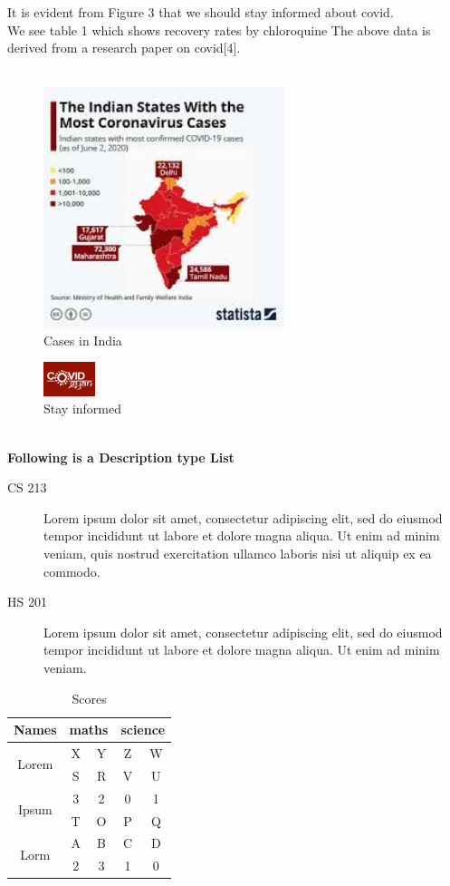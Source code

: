 \documentclass{article}
\begin{document}
It is evident from Figure 3 that we should stay informed about covid.\\
We see table 1 which shows recovery rates by chloroquine
The above data is derived from a research paper on covid[4].
\\
\\
\begin{figure}[h]
    \centering
    \includegraphics[width=7cm]{c19.jpg}
    \caption{Cases in India}
    \label{fig:enter-label}
\end{figure}
\begin{figure}[h]
    \centering
    \includegraphics[width = 1.5cm]{cov.png}
    \caption{Stay informed}
    \label{fig:enter-label}
\end{figure}
\\
\textbf{Following is a Description type List}
\begin{description}
  \item[CS 213] Lorem ipsum dolor sit amet, consectetur adipiscing elit, sed do eiusmod tempor incididunt ut labore et dolore magna aliqua. Ut enim ad minim veniam, quis nostrud exercitation ullamco laboris nisi ut aliquip ex ea commodo.

  \item[HS 201] Lorem ipsum dolor sit amet, consectetur adipiscing elit, sed do eiusmod tempor incididunt ut labore et dolore magna aliqua. Ut enim ad minim veniam.
\end{description}

\newpage
\pagecolor{green}
\begin{table}[ht]
\centering
\begin{tabular}{|c|c|c|c|c|}
    \hline
    Names & \multicolumn{2}{c|}{maths} & \multicolumn{2}{c|}{science} \\ 
    \hline
    \multirow{2}{*}{Lorem} & X & Y & Z & W \\ \cline{2-5}
    & S & R & V & U	 \\ 
    \hline
    \multirow{2}{*}{Ipsum} & 3 & 2 & 0 & 1 \\ \cline{2-5}
    & T & O & P & Q \\
    \hline
    \multirow{2}{*}{Lorm} & A & B & C & D \\ \cline{2-5}
    & 2 & 3 & 1 & 0 \\
    \hline
\end{tabular}
\caption{Scores}
\end{table}
\end{document}
